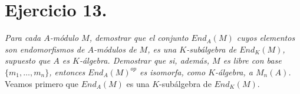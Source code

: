 \section{Ejercicio 13.}  \textit{Para cada \(A\)-módulo \(M\), demostrar que el
  conjunto \(End_A(M)\) cuyos elementos son endomorfismos de \(A\)-módulos de
  \(M\), es una \(K\)-subálgebra de \(End_K(M)\), supuesto que \(A\) es
  \(K\)-álgebra. Demostrar que si, además, \(M\) es libre con base
  \(\{m_1,\dots, m_n\}\), entonces \(End_A(M)^{op}\) es isomorfa, como
  \(K\)-álgebra, a \(M_n(A)\).}\\

Veamos primero que \(End_A(M)\) es una \(K\)-subálgebra de \(End_K(M)\).
